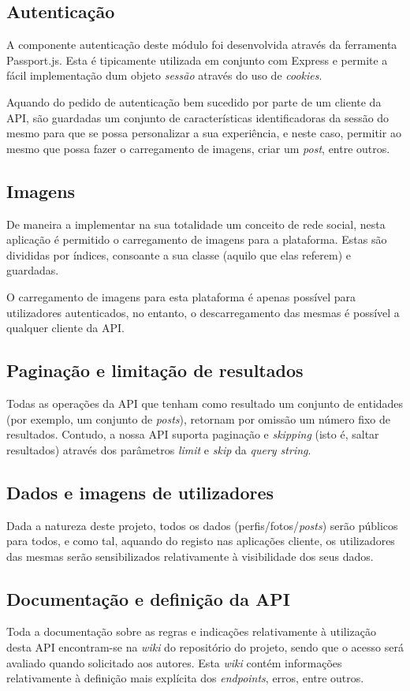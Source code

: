 \subsection{Autenticação}
A componente autenticação deste módulo foi desenvolvida através da ferramenta Passport.js. Esta é tipicamente utilizada em conjunto com Express e permite a fácil implementação dum objeto \textit{sessão} através do uso de \textit{cookies}. \par \medskip

Aquando do pedido de autenticação bem sucedido por parte de um cliente da API, são guardadas um conjunto de características identificadoras da sessão do mesmo para que se possa personalizar a sua experiência, e neste caso, permitir ao mesmo que possa fazer o carregamento de imagens, criar um \textit{post}, entre outros. \par \medskip

\subsection{Imagens}
De maneira a implementar na sua totalidade um conceito de rede social, nesta aplicação é permitido o carregamento de imagens para a plataforma. Estas são divididas por índices, consoante a sua classe (aquilo que elas referem) e guardadas. \par \medskip

O carregamento de imagens para esta plataforma é apenas possível para utilizadores autenticados, no entanto, o descarregamento das mesmas é possível a qualquer cliente da API.

\subsection{Paginação e limitação de resultados}
Todas as operações da API que tenham como resultado um conjunto de entidades (por exemplo, um conjunto de \textit{posts}), retornam por omissão um número fixo de resultados. Contudo, a nossa API suporta paginação e \textit{skipping} (isto é, saltar resultados) através dos parâmetros \textit{limit} e \textit{skip} da \textit{query string}.

\subsection{Dados e imagens de utilizadores}
Dada a natureza deste projeto, todos os dados (perfis/fotos/\textit{posts}) serão públicos para todos, e como tal, aquando do registo nas aplicações cliente, os utilizadores das mesmas serão sensibilizados relativamente à visibilidade dos seus dados.

\subsection{Documentação e definição da API}
Toda a documentação sobre as regras e indicações relativamente à utilização desta API encontram-se na \textit{wiki} do repositório do projeto, sendo que o acesso será avaliado quando solicitado aos autores. Esta \textit{wiki} contém informações relativamente à definição mais explícita dos \textit{endpoints}, erros, entre outros.